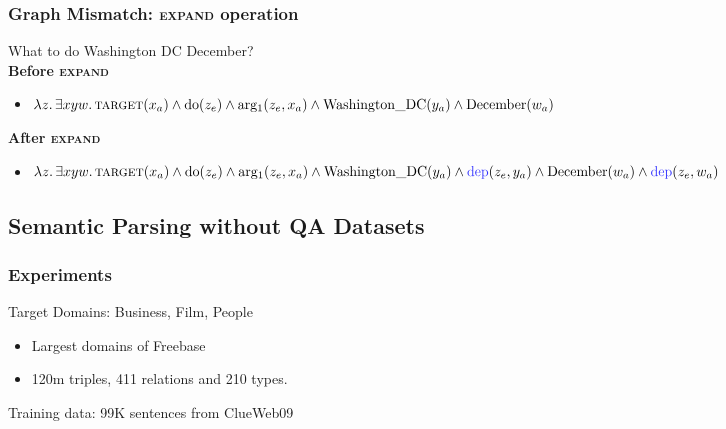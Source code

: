 \documentclass[mathserif,12pt]{beamer}
\newcommand{\hlight}[1]{{\color{blue!80} #1}}
\newcommand \expand{\textsc{expand}\xspace}
\renewcommand{\land}{\wedge}
\newcommand{\lspace}{.\,}
\begin{document}
\begin{frame}[noframenumbering]
\frametitle{Graph Mismatch: \expand operation}

 What to do Washington DC December? \\
 

 \vspace{0.5cm} 
 \textbf{Before \expand}
 \begin{itemize}
   \item $\lambda z \lspace \exists x y w \lspace \textsc{target}(x_a) \land
\mathrm{do}(z_e) \land \mathrm{arg_1}(z_e, x_a) \land
\mathrm{Washington\_DC}(y_a) \land \mathrm{December}(w_a)$
   \end{itemize}
 
 \vspace{0.5cm}
 \textbf{After \expand}
 \begin{itemize}
   \item $\lambda z\lspace \exists x y w \lspace \textsc{target}(x_a) \land \mathrm{do}(z_e) \land \mathrm{arg_1}(z_e, x_a) \land \mathrm{Washington\_DC}(y_a) \land
   \mathrm{\hlight{dep}}(z_e, y_a) \land \mathrm{December}(w_a) \land \mathrm{\hlight{dep}}(z_e, w_a)$
   \end{itemize}
\end{frame}

\subsection{Semantic Parsing without QA Datasets}
\begin{frame}[noframenumbering]
\frametitle{Experiments}
 \hlight{Target Domains:}  Business, Film, People 
  \begin{itemize}
    \item Largest domains of Freebase
    \item 120m triples, 411 relations and 210 types.
  \end{itemize}
  
  \vspace{1em}
  \hlight{Training data:} 99K sentences from ClueWeb09
\end{frame}
\end{document}
